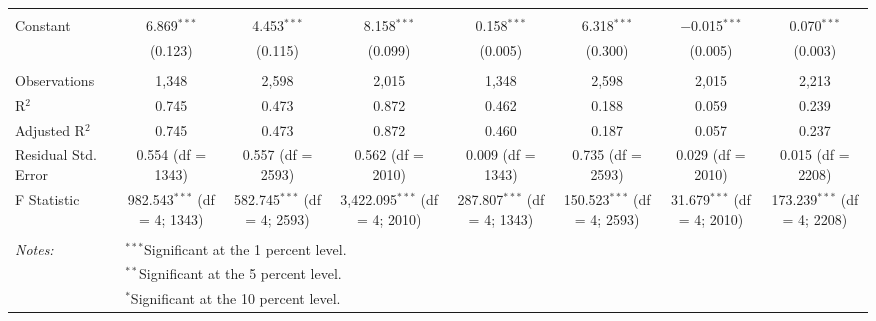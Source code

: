 \begin{table}[!htbp]
\begin{tabular}{@{\extracolsep{5pt}}lccccccc}
  & & & & & & & \\ 
 Constant & 6.869$^{***}$ & 4.453$^{***}$ & 8.158$^{***}$ & 0.158$^{***}$ & 6.318$^{***}$ & $-$0.015$^{***}$ & 0.070$^{***}$ \\ 
  & (0.123) & (0.115) & (0.099) & (0.005) & (0.300) & (0.005) & (0.003) \\ 
  & & & & & & & \\ 
Observations & 1,348 & 2,598 & 2,015 & 1,348 & 2,598 & 2,015 & 2,213 \\ 
R$^{2}$ & 0.745 & 0.473 & 0.872 & 0.462 & 0.188 & 0.059 & 0.239 \\ 
Adjusted R$^{2}$ & 0.745 & 0.473 & 0.872 & 0.460 & 0.187 & 0.057 & 0.237 \\ 
Residual Std. Error & 0.554 (df = 1343) & 0.557 (df = 2593) & 0.562 (df = 2010) & 0.009 (df = 1343) & 0.735 (df = 2593) & 0.029 (df = 2010) & 0.015 (df = 2208) \\ 
F Statistic & 982.543$^{***}$ (df = 4; 1343) & 582.745$^{***}$ (df = 4; 2593) & 3,422.095$^{***}$ (df = 4; 2010) & 287.807$^{***}$ (df = 4; 1343) & 150.523$^{***}$ (df = 4; 2593) & 31.679$^{***}$ (df = 4; 2010) & 173.239$^{***}$ (df = 4; 2208) \\ 
\hline \\[-1.8ex] 
\textit{Notes:} & \multicolumn{7}{l}{$^{***}$Significant at the 1 percent level.} \\ 
 & \multicolumn{7}{l}{$^{**}$Significant at the 5 percent level.} \\ 
 & \multicolumn{7}{l}{$^{*}$Significant at the 10 percent level.} \\ 
\end{tabular} 
\end{table} 

